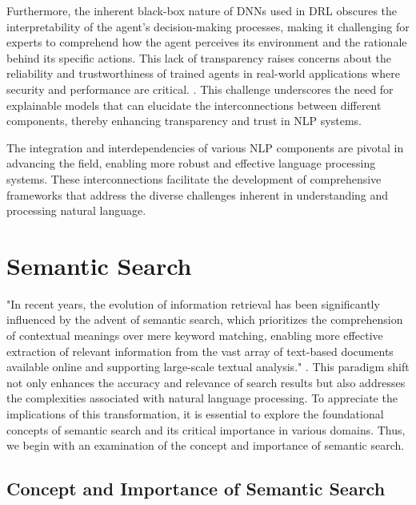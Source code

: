 Furthermore, the inherent black-box nature of DNNs used in DRL obscures the interpretability of the agent's decision-making processes, making it challenging for experts to comprehend how the agent perceives its environment and the rationale behind its specific actions. This lack of transparency raises concerns about the reliability and trustworthiness of trained agents in real-world applications where security and performance are critical. \cite{qing2023surveyexplainablereinforcementlearning}. This challenge underscores the need for explainable models that can elucidate the interconnections between different components, thereby enhancing transparency and trust in NLP systems.



The integration and interdependencies of various NLP components are pivotal in advancing the field, enabling more robust and effective language processing systems. These interconnections facilitate the development of comprehensive frameworks that address the diverse challenges inherent in understanding and processing natural language.












\section{Semantic Search} \label{sec:Semantic Search}

"In recent years, the evolution of information retrieval has been significantly influenced by the advent of semantic search, which prioritizes the comprehension of contextual meanings over mere keyword matching, enabling more effective extraction of relevant information from the vast array of text-based documents available online and supporting large-scale textual analysis." \cite{altuncu2022improvingperformanceautomatickeyword}. This paradigm shift not only enhances the accuracy and relevance of search results but also addresses the complexities associated with natural language processing. To appreciate the implications of this transformation, it is essential to explore the foundational concepts of semantic search and its critical importance in various domains. Thus, we begin with an examination of the concept and importance of semantic search.





\subsection{Concept and Importance of Semantic Search} \label{subsec:Concept and Importance of Semantic Search}

